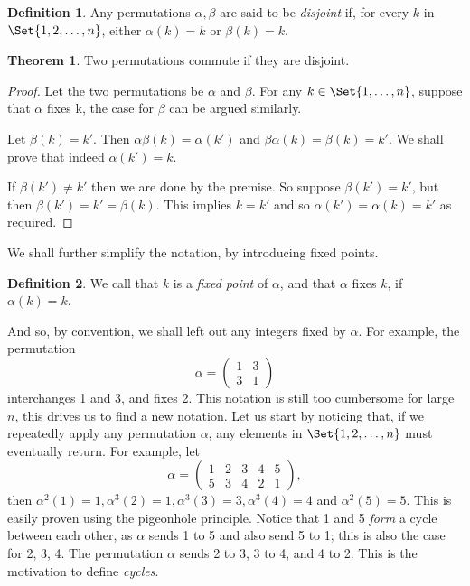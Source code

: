 \documentclass[12pt]{book}
\theoremstyle{definition}
\newtheorem{definition}{Definition}[section]
\newtheorem{theorem}{Theorem}[chapter]
\theoremstyle{remark}
\begin{document}
			\begin{definition}
				Any permutations $\alpha, \beta$ are said to be \textit{disjoint} if, for every $k$ in $\Set{1, 2, \ldots, n}$, either $\alpha(k) = k$ or $\beta(k) = k$.
			\end{definition}
			\begin{theorem}
				Two permutations commute if they are disjoint.
			\end{theorem}
			\begin{proof}
				Let the two permutations be $\alpha$ and $\beta$. For any $k \in \Set{1, \ldots, n}$, suppose that $\alpha$ fixes k, the case for $\beta$ can be argued similarly. 
				
				Let $\beta(k) = k'$. Then $\alpha\beta (k) = \alpha(k')$ and $\beta\alpha(k) = \beta(k) = k'$. We shall prove that indeed $\alpha(k') = k$.
				
				If $\beta(k') \neq k'$ then we are done by the premise. So suppose $\beta(k') = k'$, but then $\beta(k') = k' = \beta(k)$. This implies $k = k'$ and so $\alpha(k') = \alpha(k) = k'$ as required.
			\end{proof}
			We shall further simplify the notation, by introducing fixed points.
			\begin{definition}
				We call that $k$ is a \textit{fixed point}  of $\alpha$, and that $\alpha$ fixes $k$, if $\alpha(k) = k$.
			\end{definition}
			 And so, by convention, we shall left out any integers fixed by $\alpha$. For example, the permutation
			 \begin{equation*}
				 \alpha = \begin{pmatrix}
					 1 & 3 \\
					 3 & 1
				 \end{pmatrix}
			 \end{equation*}
			 interchanges 1 and 3, and fixes 2. This notation is still too cumbersome for large $n$, this drives us to find a new notation. Let us start by noticing that, if we repeatedly apply any permutation $\alpha$, any elements in $\Set{1, 2, \ldots, n}$ must eventually return. For example, let
			 \begin{equation*}
			 \alpha = \begin{pmatrix}
				 1 & 2 & 3 & 4 & 5\\
				 5 & 3 & 4 & 2 & 1
			 \end{pmatrix},
			 \end{equation*}
			 then $\alpha^2(1) = 1, \alpha^3(2) = 1, \alpha^3(3) = 3, \alpha^3(4) = 4$ and $\alpha^2(5) = 5$. This is easily proven using the pigeonhole principle. Notice that 1 and 5 \textit{form} a cycle between each other, as $\alpha$ sends 1 to 5 and also send 5 to 1; this is also the case for 2, 3, 4. The permutation $\alpha$ sends 2 to 3, 3 to 4, and 4 to 2. This is the motivation to define \textit{cycles}.
\end{document}
